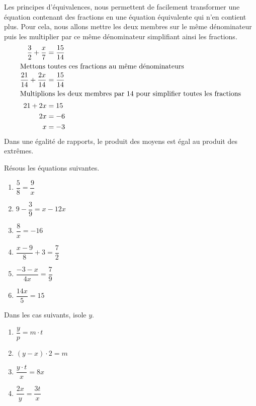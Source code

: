 \documentclass[../../syllabus_2.tex]{subfiles}
\begin{document}
Les principes d'équivalences, nous permettent de facilement transformer une équation contenant des fractions en une équation équivalente qui n'en contient plus. Pour cela, nous allons mettre les deux membres sur le même dénominateur puis les multiplier par ce même dénominateur simplifiant ainsi les fractions.
\begin{align*}
  \dfrac{3}{2} + \dfrac{x}{7} &= \dfrac{15}{14}\\
  \intertext{Mettons toutes ces fractions au même dénominateurs}
  \dfrac{21}{14} + \dfrac{2x}{14} &= \dfrac{15}{14}\\
  \intertext{Multiplions les deux membres par 14 pour simplifier toutes les fractions}
  21 + 2x &= 15\\
  2x &= -6\\
  x &= -3
\end{align*}
\vspace{1cm}
Dans une égalité de rapports, le produit des moyens est égal au produit des extrêmes.
\exemples 

\newpage
\begin{exercise}
  Résous les équations suivantes.
  \begin{enumerate}[cols=2, itemsep=5.5cm]
    \item $\dfrac{5}{8} = \dfrac{9}{x}$
    \item $9 - \dfrac{3}{9} = x - 12x$
    \item $\dfrac{8}{x} = - 16$
    \item $\dfrac{x - 9}{8} + 3 = \dfrac{7}{2}$
    \item $\dfrac{- 3 - x}{4x} = \dfrac{7}{9}$
    \item $\dfrac{14x}{5} = 15$
  \end{enumerate}
  \vspace*{2cm}
\end{exercise}

\begin{exercise}
  Dans les cas suivants, isole \(y\). 
  \begin{enumerate}[cols=2, itemsep=2cm]
    \item \(\dfrac{y}{p}=m\cdot t\)
    \item \(\left(y-x\right) \cdot 2 = m\)
    \item \(\dfrac{y\cdot t}{x} = 8x\)
    \item \(\dfrac{2x}{y} = \dfrac{3t}{x}\)
  \end{enumerate}
\end{exercise}
\end{document}
